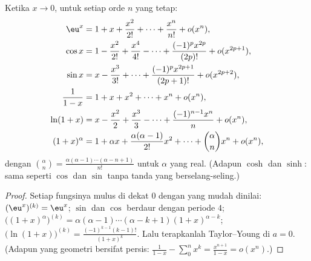 \begin{proposition}
Ketika $x \to 0$, untuk setiap orde $n$ yang tetap:
\begin{align*}
\eu^x &= 1 + x + \frac{x^2}{2!} + \dots + \frac{x^n}{n!} + o(x^n),\\
\cos x &= 1 - \frac{x^2}{2!} + \frac{x^4}{4!} - \dots
+ \frac{(-1)^p x^{2p}}{(2p)!} + o(x^{2p+1}),\\
\sin x &= x - \frac{x^3}{3!} + \dots + \frac{(-1)^p
x^{2p+1}}{(2p+1)!} + o(x^{2p+2}),\\
\frac{1}{1 - x} &= 1 + x + x^2 + \dots + x^n + o(x^n),\\
\ln(1 + x) &= x - \frac{x^2}{2} + \frac{x^3}{3} - \dots +
\frac{(-1)^{n-1} x^n}{n} + o(x^n),\\
(1 + x)^\alpha &= 1 + \alpha x + \frac{\alpha(\alpha-1)}{2!}x^2 +
\dots + \binom{\alpha}{n} x^n + o(x^n),
\end{align*}
dengan $\binom{\alpha}{n} = \frac{\alpha(\alpha - 1)\cdots(\alpha - n
+ 1)}{n!}$ untuk $\alpha$ yang real. (Adapun $\cosh$ dan $\sinh$: sama seperti $\cos$
dan $\sin$ tanpa tanda yang berselang-seling.)
\label{prop:b1:taylor:standard}
\end{proposition}

\begin{proof}
Setiap fungsinya mulus di dekat $0$ dengan  yang mudah dinilai:
$(\eu^x)^{(k)} = \eu^x$;  $\sin$ dan $\cos$ berdaur
dengan periode $4$; $\bigl((1+x)^\alpha\bigr)^{(k)} = \alpha(\alpha -
1)\cdots(\alpha - k + 1)(1+x)^{\alpha - k}$;
$\bigl(\ln(1+x)\bigr)^{(k)} = \frac{(-1)^{k-1}(k-1)!}{(1+x)^k}$.
Lalu terapkanlah Taylor--Young di $a = 0$. (Adapun yang geometri bersifat persis:
$\frac{1}{1-x} - \sum_0^n x^k = \frac{x^{n+1}}{1 - x} = o(x^n)$.)
\end{proof}

